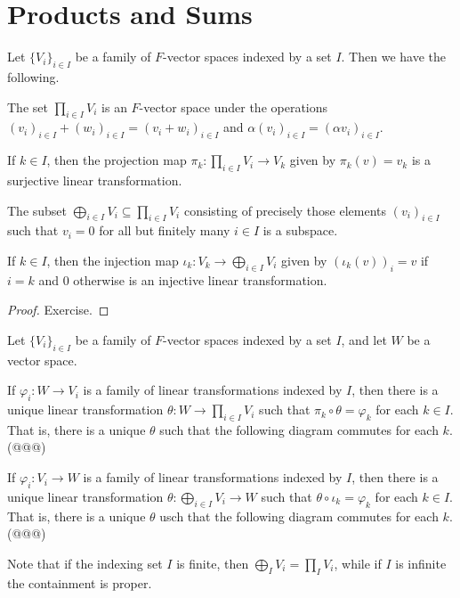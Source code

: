 \section{Products and Sums}

\begin{prp}
Let $\{V_i\}_{i \in I}$ be a family of $F$-vector spaces indexed by a set $I$. Then we have the following.
\begin{enumerate*}
\item The set $\prod_{i \in I} V_i$ is an $F$-vector space under the operations $(v_i)_{i \in I} + (w_i)_{i \in I} = (v_i + w_i)_{i \in I}$ and $\alpha(v_i)_{i \in I} = (\alpha v_i)_{i \in I}$. 
\item If $k \in I$, then the projection map $\pi_k : \prod_{i \in I} V_i \rightarrow V_k$ given by $\pi_k(v) = v_k$ is a surjective linear transformation.
\item The subset $\bigoplus_{i \in I} V_i \subseteq \prod_{i \in I} V_i$ consisting of precisely those elements $(v_i)_{i \in I}$ such that $v_i = 0$ for all but finitely many $i \in I$ is a subspace.
\item If $k \in I$, then the injection map $\iota_k : V_k \rightarrow \bigoplus_{i \in I} V_i$ given by $(\iota_k(v))_i = v$ if $i = k$ and $0$ otherwise is an injective linear transformation.
\end{enumerate*}
\end{prp}

\begin{proof}
Exercise.
\end{proof}

\begin{prp}
Let $\{V_i\}_{i \in I}$ be a family of $F$-vector spaces indexed by a set $I$, and let $W$ be a vector space.
\begin{enumerate*}
\item If $\varphi_i : W \rightarrow V_i$ is a family of linear transformations indexed by $I$, then there is a unique linear transformation $\theta : W \rightarrow \prod_{i \in I} V_i$ such that $\pi_k \circ \theta = \varphi_k$ for each $k \in I$. That is, there is a unique $\theta$ such that the following diagram commutes for each $k$. (@@@)
\item If $\varphi_i : V_i \rightarrow W$ is a family of linear transformations indexed by $I$, then there is a unique linear transformation $\theta : \bigoplus_{i \in I} V_i \rightarrow W$ such that $\theta \circ \iota_k = \varphi_k$ for each $k \in I$. That is, there is a unique $\theta$ usch that the following diagram commutes for each $k$. (@@@)
\end{enumerate*}
\end{prp}

Note that if the indexing set $I$ is finite, then $\bigoplus_I V_i = \prod_I V_i$, while if $I$ is infinite the containment is proper.

\NowForSomeExercises

\begin{exercises}
\item 
\end{exercises}